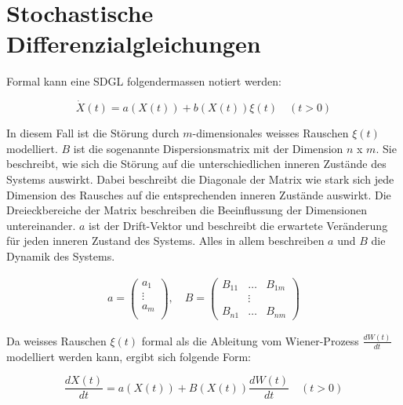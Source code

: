 %
%
%
%

\section{Stochastische Differenzialgleichungen\label{brown:SDGL}}

Formal kann eine SDGL folgendermassen notiert werden: 

\begin{equation}
	\label{brown:SDGL:whiteNoise}
	\dot{X}(t) = a(X(t)) + b(X(t))\xi(t) \quad (t>0)
\end{equation}

In diesem Fall ist die Störung durch $ m $-dimensionales weisses Rauschen $ \xi(t) $ modelliert. $ B $ ist die sogenannte Dispersionsmatrix mit der Dimension $ n $ x $ m $. Sie beschreibt, wie sich die Störung auf die unterschiedlichen inneren Zustände des Systems auswirkt. Dabei beschreibt die Diagonale der Matrix wie stark sich jede Dimension des Rausches auf die entsprechenden inneren Zustände auswirkt. Die Dreieckbereiche der Matrix beschreiben die Beeinflussung der Dimensionen untereinander. $ a $ ist der Drift-Vektor und beschreibt die erwartete Veränderung für jeden inneren Zustand des Systems. Alles in allem beschreiben $ a $ und $ B $ die Dynamik des Systems. 

\begin{align*}
	a = 
	\begin{pmatrix}
		a_{1} \\
		\vdots \\
		a_{m}\\ 
	\end{pmatrix}
	, \quad
	B = 
	\begin{pmatrix}
		B_{11} & \dots & B_{1m} \\
		& \vdots & \\
		B_{n1} & \dots & B_{nm} 
	\end{pmatrix}
\end{align*}


Da weisses Rauschen $ \xi(t) $ formal als die Ableitung vom Wiener-Prozess $ \frac{dW(t)}{dt} $ modelliert werden kann, ergibt sich folgende Form:

\begin{equation}
	\frac{dX(t)}{dt} = a(X(t)) + B(X(t)) \frac{dW(t)}{dt} \quad (t>0)
\end{equation}

